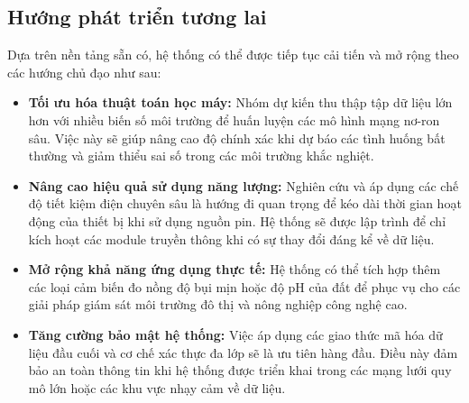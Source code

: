 \subsection{Hướng phát triển tương lai}
Dựa trên nền tảng sẵn có, hệ thống có thể được tiếp tục cải tiến và mở rộng theo các hướng chủ đạo như sau:
\begin{itemize}
    \item \textbf{Tối ưu hóa thuật toán học máy:} Nhóm dự kiến thu thập tập dữ liệu lớn hơn với nhiều biến số môi trường để huấn luyện các mô hình mạng nơ-ron sâu. Việc này sẽ giúp nâng cao độ chính xác khi dự báo các tình huống bất thường và giảm thiểu sai số trong các môi trường khắc nghiệt.
    \item \textbf{Nâng cao hiệu quả sử dụng năng lượng:} Nghiên cứu và áp dụng các chế độ tiết kiệm điện chuyên sâu là hướng đi quan trọng để kéo dài thời gian hoạt động của thiết bị khi sử dụng nguồn pin. Hệ thống sẽ được lập trình để chỉ kích hoạt các module truyền thông khi có sự thay đổi đáng kể về dữ liệu.
    \item \textbf{Mở rộng khả năng ứng dụng thực tế:} Hệ thống có thể tích hợp thêm các loại cảm biến đo nồng độ bụi mịn hoặc độ pH của đất để phục vụ cho các giải pháp giám sát môi trường đô thị và nông nghiệp công nghệ cao.
    \item \textbf{Tăng cường bảo mật hệ thống:} Việc áp dụng các giao thức mã hóa dữ liệu đầu cuối và cơ chế xác thực đa lớp sẽ là ưu tiên hàng đầu. Điều này đảm bảo an toàn thông tin khi hệ thống được triển khai trong các mạng lưới quy mô lớn hoặc các khu vực nhạy cảm về dữ liệu.
\end{itemize}